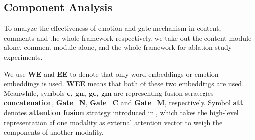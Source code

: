 \documentclass[conference]{IEEEtran}
\begin{document}
	\subsection{Component Analysis}
	To analyze the effectiveness of emotion and gate mechanism in content, comments and the whole framework respectively, we take out the content module alone, comment module alone, and the whole framework for ablation study experiments. 
	
	We use \textbf{WE} and \textbf{EE} to denote that only word embeddings or emotion embeddings is used. \textbf{WEE} means that both of these two embeddings are used. 
	Meanwhile, symbols \textbf{c, gn, gc, gm} are representing fusion strategies {\bf concatenation}, {\bf Gate\_N}, {\bf Gate\_C} and {\bf Gate\_M}, respectively. Symbol \textbf{att} denotes {\bf attention fusion} strategy introduced in \cite{jin2017multimodal}, which takes the high-level representation of one modality as external attention vector to weigh the components of another modality.
	
\end{document}
